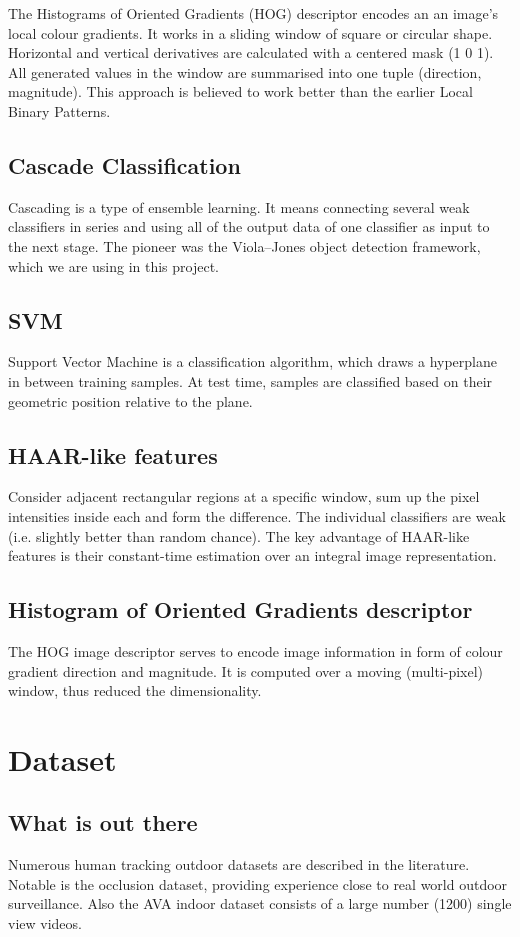 \documentclass{article}
\begin{document}
The Histograms of Oriented Gradients (HOG)\cite{hog} descriptor encodes an an image's local colour gradients.
It works in a sliding window of square or circular shape.
Horizontal and vertical derivatives are calculated with a centered mask (1 0 1).
All generated values in the window are summarised into one tuple (direction, magnitude).
This approach is believed to work better than the earlier Local Binary Patterns.

\subsection{Cascade Classification}
Cascading is a type of ensemble learning.
It means connecting several weak classifiers in series and using all of the output data of one classifier as input to the next stage.
The pioneer was the Viola–Jones object detection framework, which we are using in this project.


\subsection{SVM}
Support Vector Machine is a classification algorithm, which draws a hyperplane in between training samples.
At test time, samples are classified based on their geometric position relative to the plane.


\subsection{HAAR-like features}
Consider adjacent rectangular regions at a specific window, sum up the pixel intensities inside each and form the difference.
The individual classifiers are weak (i.e. slightly better than random chance).
The key advantage of HAAR-like features is their constant-time estimation over an integral image representation.


\subsection{Histogram of Oriented Gradients descriptor}
The HOG image descriptor serves to encode image information in form of colour gradient direction and magnitude.
It is computed over a moving (multi-pixel) window, thus reduced the dimensionality.


\section{Dataset}
\subsection{What is out there}
Numerous human tracking outdoor datasets are described in the literature\cite{datasets0}\cite{datasets1}.
Notable is the occlusion dataset\cite{datasets2}, providing experience close to real world outdoor surveillance.
Also the AVA indoor dataset\cite{ava} consists of a large number (1200) single view videos.
\end{document}
